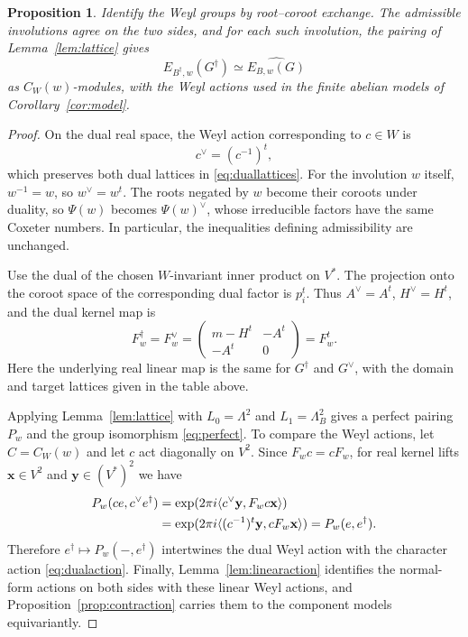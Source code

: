\documentclass[11pt,a4paper,reqno]{amsart}
\theoremstyle{plain}
\newtheorem{proposition}[theorem]{Proposition}
\theoremstyle{definition}
\theoremstyle{remark}
\numberwithin{equation}{section}
\newcommand{\pair}[2]{\langle #1,#2\rangle}
\newcommand{\eexp}[1]{\exp(2\pi i #1)}
\begin{document}
\begin{proposition}\label{prop:rootduality} Identify the Weyl groups by root--coroot exchange. The admissible involutions agree on the two sides, and for each such involution, the pairing of Lemma~\ref{lem:lattice} gives
\begin{equation}\label{eq:perfect}
E_{B^\dagger,w}(G^\dagger)\simeq\widehat{E_{B,w}(G)}
\end{equation}
as $C_W(w)$-modules, with the Weyl actions used in the finite abelian models of Corollary~\ref{cor:model}.
\end{proposition}
\begin{proof}
On the dual real space, the Weyl action corresponding to $c\in W$ is
\begin{equation}\label{eq:weylcontragredient}
c^\vee=(c^{-1})^t,
\end{equation}
which preserves both dual lattices in \eqref{eq:duallattices}. For the involution $w$ itself, $w^{-1}=w$, so $w^\vee=w^t$. The roots negated by $w$ become their coroots under duality, so $\Psi(w)$ becomes $\Psi(w)^\vee$, whose irreducible factors have the same Coxeter numbers. In particular, the inequalities defining admissibility are unchanged.

Use the dual of the chosen $W$-invariant inner product on $V^*$. The projection onto the coroot space of the corresponding dual factor is $p_i^t$. Thus $A^\vee=A^t$, $H^\vee=H^t$, and the dual kernel map is
\begin{equation}\label{eq:transpose}
F_w^\dagger=F_w^\vee =\begin{pmatrix}m-H^t&-A^t\\-A^t&0\end{pmatrix} =F_w^t.
\end{equation}
Here the underlying real linear map is the same for $G^\dagger$ and $G^\vee$, with the domain and target lattices given in the table above.

Applying Lemma~\ref{lem:lattice} with $L_0=\Lambda^2$ and $L_1=\Lambda_B^2$ gives a perfect pairing $P_w$ and the group isomorphism \eqref{eq:perfect}. To compare the Weyl actions, let $C=C_W(w)$ and let $c$ act diagonally on $V^2$. Since $F_wc=cF_w$, for real kernel lifts $\mathbf{x}\in V^2$ and $\mathbf{y}\in(V^*)^2$ we have
\begin{align}
P_w(ce,c^\vee e^\dagger) &=\eexp{\pair{c^\vee\mathbf{y}}{F_wc\mathbf{x}}}\notag\\
&=\eexp{\pair{(c^{-1})^t\mathbf{y}}{cF_w\mathbf{x}}} =P_w(e,e^\dagger).\label{eq:rootpairinginvariance}
\end{align}
Therefore $e^\dagger\mapsto P_w(-,e^\dagger)$ intertwines the dual Weyl action with the character action \eqref{eq:dualaction}. Finally, Lemma~\ref{lem:linearaction} identifies the normal-form actions on both sides with these linear Weyl actions, and Proposition~\ref{prop:contraction} carries them to the component models equivariantly.
\end{proof}
\end{document}
